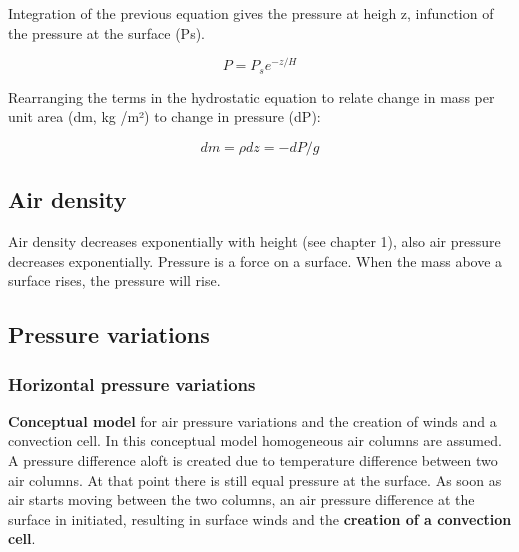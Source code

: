 \documentclass[oneside]{book}
\begin{document}
Integration of the previous equation gives the pressure at heigh z,
infunction of the pressure at the surface (Ps).

\begin{equation} 
  P = P_s e^{-z/H}
   \label{eq:Eqhydrostatic3}
\end{equation}

Rearranging the terms in the hydrostatic equation to relate change in
mass per unit area (dm, kg /m²) to change in pressure (dP):

\begin{equation} 
  dm = \rho dz = - dP / g
   \label{eq:Eqhydrostatic4}
\end{equation}

\subsection{Air density}\label{air-density}

Air density decreases exponentially with height (see chapter 1), also
air pressure decreases exponentially. Pressure is a force on a surface.
When the mass above a surface rises, the pressure will rise.

\subsection{Pressure variations}\label{pressure-variations}

\subsubsection{Horizontal pressure
variations}\label{horizontal-pressure-variations}

\textbf{Conceptual model} for air pressure variations and the creation
of winds and a convection cell. In this conceptual model homogeneous air
columns are assumed. A pressure difference aloft is created due to
temperature difference between two air columns. At that point there is
still equal pressure at the surface. As soon as air starts moving
between the two columns, an air pressure difference at the surface in
initiated, resulting in surface winds and the \textbf{creation of a
convection cell}.
\end{document}
